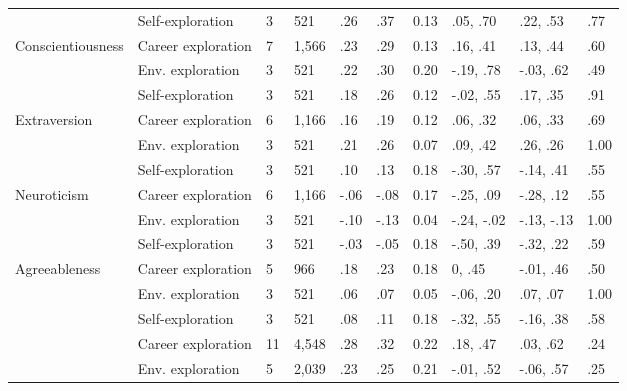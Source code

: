 \begin{table}[ht]
\begin{tabular}{llllllllll}
   & \hspace{0.8em}Self-exploration & 3 & 521 & .26 & .37 & 0.13 & .05, .70 & .22, .53 & .77 \\ 
  Conscientiousness & Career exploration & 7 & 1,566 & .23 & .29 & 0.13 & .16, .41 & .13, .44 & .60 \\ 
   & \hspace{0.8em}Env. exploration & 3 & 521 & .22 & .30 & 0.20 & -.19, .78 & -.03, .62 & .49 \\ 
   & \hspace{0.8em}Self-exploration & 3 & 521 & .18 & .26 & 0.12 & -.02, .55 & .17, .35 & .91 \\ 
  Extraversion & Career exploration & 6 & 1,166 & .16 & .19 & 0.12 & .06, .32 & .06, .33 & .69 \\ 
   & \hspace{0.8em}Env. exploration & 3 & 521 & .21 & .26 & 0.07 & .09, .42 & .26, .26 & 1.00 \\ 
   & \hspace{0.8em}Self-exploration & 3 & 521 & .10 & .13 & 0.18 & -.30, .57 & -.14, .41 & .55 \\ 
  Neuroticism & Career exploration & 6 & 1,166 & -.06 & -.08 & 0.17 & -.25, .09 & -.28, .12 & .55 \\ 
   & \hspace{0.8em}Env. exploration & 3 & 521 & -.10 & -.13 & 0.04 & -.24, -.02 & -.13, -.13 & 1.00 \\ 
   & \hspace{0.8em}Self-exploration & 3 & 521 & -.03 & -.05 & 0.18 & -.50, .39 & -.32, .22 & .59 \\ 
  Agreeableness & Career exploration & 5 & 966 & .18 & .23 & 0.18 & 0, .45 & -.01, .46 & .50 \\ 
   & \hspace{0.8em}Env. exploration & 3 & 521 & .06 & .07 & 0.05 & -.06, .20 & .07, .07 & 1.00 \\ 
   & \hspace{0.8em}Self-exploration & 3 & 521 & .08 & .11 & 0.18 & -.32, .55 & -.16, .38 & .58 \\ 
   & Career exploration & 11 & 4,548 & .28 & .32 & 0.22 & .18, .47 & .03, .62 & .24 \\ 
   & \hspace{0.8em}Env. exploration & 5 & 2,039 & .23 & .25 & 0.21 & -.01, .52 & -.06, .57 & .25 \\ 

\end{tabular}
\end{table}
